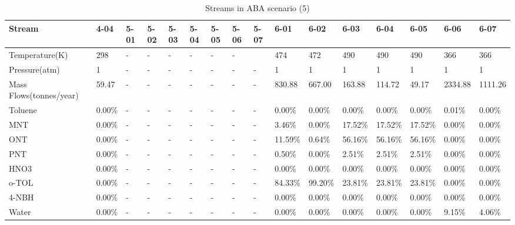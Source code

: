 \begin{landscape}
\begin{table}[H]
\centering
\caption{Streams in ABA scenario (5)}
\label{ABAFST5}
\begin{tabular}{|l|l|l|l|l|l|l|l|l|l|l|l|l|l|l|l|}
\hline
\textbf{Stream}         & 4-04    & 5-01 & 5-02 & 5-03 & 5-04 & 5-05 & 5-06 & 5-07 & 6-01    & 6-02    & 6-03    & 6-04    & 6-05    & 6-06    & 6-07    \\ \hline
Temperature(K)          & 298     & -    & -    & -    & -    & -    & -    &      & 474     & 472     & 490     & 490     & 490     & 366     & 366     \\ \hline
Pressure(atm)           & 1       & -    & -    & -    & -    & -    & -    & -    & 1       & 1       & 1       & 1       & 1       & 1       & 1       \\ \hline
Mass Flows(tonnes/year) & 59.47   & -    & -    & -    & -    & -    & -    & -    & 830.88  & 667.00  & 163.88  & 114.72  & 49.17   & 2334.88 & 1111.26 \\ \hline
Toluene                 & 0.00\%  & -    & -    & -    & -    & -    & -    & -    & 0.00\%  & 0.00\%  & 0.00\%  & 0.00\%  & 0.00\%  & 0.01\%  & 0.00\%  \\ \hline
MNT                     & 0.00\%  & -    & -    & -    & -    & -    & -    & -    & 3.46\%  & 0.00\%  & 17.52\% & 17.52\% & 17.52\% & 0.00\%  & 0.00\%  \\ \hline
ONT                     & 0.00\%  & -    & -    & -    & -    & -    & -    & -    & 11.59\% & 0.64\%  & 56.16\% & 56.16\% & 56.16\% & 0.00\%  & 0.00\%  \\ \hline
PNT                     & 0.00\%  & -    & -    & -    & -    & -    & -    & -    & 0.50\%  & 0.00\%  & 2.51\%  & 2.51\%  & 2.51\%  & 0.00\%  & 0.00\%  \\ \hline
HNO3                    & 0.00\%  & -    & -    & -    & -    & -    & -    & -    & 0.00\%  & 0.00\%  & 0.00\%  & 0.00\%  & 0.00\%  & 0.00\%  & 0.00\%  \\ \hline
o-TOL                   & 0.00\%  & -    & -    & -    & -    & -    & -    & -    & 84.33\% & 99.20\% & 23.81\% & 23.81\% & 23.81\% & 0.00\%  & 0.00\%  \\ \hline
4-NBH                   & 0.00\%  & -    & -    & -    & -    & -    & -    & -    & 0.00\%  & 0.00\%  & 0.00\%  & 0.00\%  & 0.00\%  & 0.00\%  & 0.00\%  \\ \hline
Water                   & 0.00\%  & -    & -    & -    & -    & -    & -    & -    & 0.00\%  & 0.00\%  & 0.00\%  & 0.00\%  & 0.00\%  & 9.15\%  & 4.06\%  \\ \hline

\end{tabular}
\end{table}
\end{landscape}
